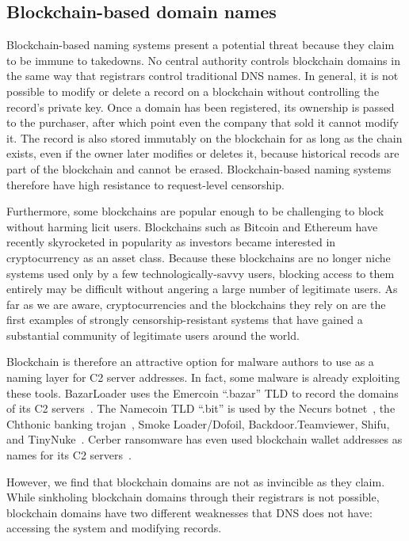 \subsection{Blockchain-based domain names}

Blockchain-based naming systems present a potential threat 
because they claim to be immune to takedowns. No central authority 
controls blockchain domains in the same way that registrars 
control traditional DNS names. In general, it is not possible to modify or 
delete a record on a blockchain without controlling the record's private 
key. Once a domain has 
been registered, its ownership is passed to the purchaser, after which 
point even the company that 
sold it cannot modify it. The record is also stored immutably on the 
blockchain for as long as the 
chain exists, even if the owner later modifies or deletes it, because 
historical recods are part of 
the blockchain and cannot be erased. Blockchain-based naming systems 
therefore have high resistance 
to request-level censorship.

Furthermore, some blockchains are popular enough to be challenging to block 
without 
harming licit users. Blockchains such as Bitcoin and Ethereum have recently 
skyrocketed in popularity as investors became interested in cryptocurrency as 
an asset class. Because these blockchains are no longer niche systems used 
only by a few 
technologically-savvy users, blocking access 
to them entirely may be difficult without angering a large number of 
legitimate users. As far as we are aware, cryptocurrencies and the blockchains 
they rely on are the first examples of strongly censorship-resistant systems 
that have gained a substantial community of legitimate users around the world.

Blockchain is therefore an attractive option for malware authors to use as a 
naming 
layer for C2 server addresses. In fact, some malware is already exploiting 
these tools.
BazarLoader uses the Emercoin ``.bazar'' TLD to record the domains of its C2 
servers~\cite{brandt_bazarloader_2021}. The Namecoin TLD 
``.bit'' is used by the
Necurs botnet~\cite{dgas_of_necurs}, the Chthonic banking 
trojan~\cite{malware_traffic_analysis_2016}, Smoke Loader/Dofoil, 
Backdoor.Teamviewer, Shifu, 
and TinyNuke~\cite{abusech_2017, mackie_cryptodns_2018}. Cerber ransomware 
has 
even used blockchain wallet addresses as names for its C2 
servers~\cite{pletinckx_malware_2018}.

However, we find that blockchain domains are not as invincible as they 
claim. While sinkholing 
blockchain domains through their registrars is not possible, blockchain 
domains have two different 
weaknesses that DNS does not have: accessing the system and modifying records.

